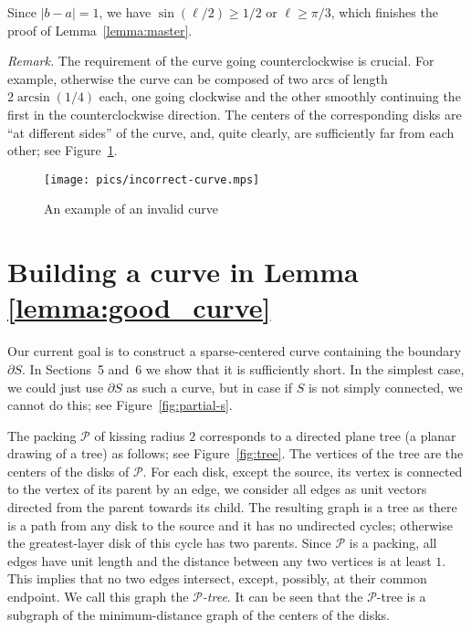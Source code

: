 \medskip Since $|b - a| = 1$, we have $\sin(\ell/2)\geq 1/2$ or $\ell\geq\pi/3$, which finishes the proof of Lemma~\ref{lemma:master}.

\textit{Remark.} The requirement of the curve going counterclockwise is crucial. For example, otherwise the curve can be composed of two arcs of length $2\arcsin(1/4)$ each, one going clockwise and the other smoothly continuing the first in the counterclockwise direction. The centers of the corresponding disks are ``at different sides'' of the curve, and, quite clearly, are sufficiently far from each other; see Figure~\ref{fig:incorrect-curve}.

\begin{figure}[h!]
    \centering
    \texttt{[image: pics/incorrect-curve.mps]}
    \captionsetup{width=.7\textwidth}
    \caption{An example of an invalid curve}
    \label{fig:incorrect-curve}
\end{figure}

\section{Building a curve in Lemma \ref{lemma:good_curve}}

Our current goal is to construct a sparse-centered curve containing the boundary $\partial S$. In Sections~5 and~6 we show that it is sufficiently short.
In the simplest case, we could just use $\partial S$ as such a curve, but in case if $S$ is not simply connected, we cannot do this; see Figure~\ref{fig:partial-s}.

The packing $\mathcal{P}$ of kissing radius $2$ corresponds to a directed plane tree (a planar drawing of a tree) as follows; see Figure~\ref{fig:tree}. The vertices of the tree are the centers of the disks of $\mathcal{P}$. For each disk, except the source, its vertex is connected to the vertex of its parent by an edge, we consider all edges as unit vectors directed from the parent towards its child. The resulting graph is a tree as there is a path from any disk to the source and it has no undirected cycles; otherwise the greatest-layer disk of this cycle has two parents. Since $\mathcal{P}$ is a packing, all edges have unit length and the distance between any two vertices is at least $1$. This implies that no two edges intersect, except, possibly, at their common endpoint. We call this graph the \textit{$\mathcal{P}$-tree}. It can be seen that the $\mathcal{P}$-tree is a subgraph of the minimum-distance graph of the centers of the disks.

